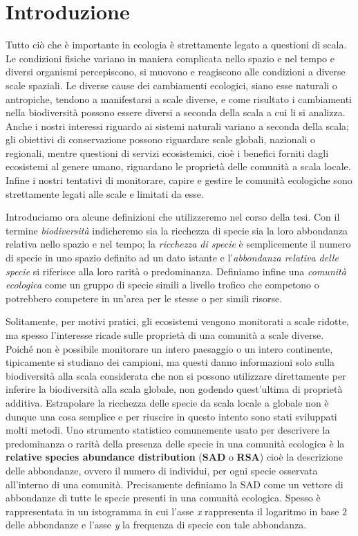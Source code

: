 \chapter*{Introduzione}
Tutto ciò che è importante in ecologia è strettamente legato a questioni di scala\cite{doi:10.1111/2041-210X.12319}. Le condizioni fisiche variano in maniera complicata nello spazio e nel tempo e diversi organismi percepiscono, si muovono e reagiscono alle condizioni a diverse scale spaziali. 
Le diverse cause dei cambiamenti ecologici, siano esse naturali o antropiche, tendono a manifestarsi a scale diverse, e come risultato i cambiamenti nella biodiversità possono essere diversi a seconda della scala a cui li si analizza. Anche i nostri interessi riguardo ai sistemi naturali variano a seconda della scala; gli obiettivi di conservazione possono riguardare scale globali, nazionali o regionali, mentre questioni di servizi ecosistemici, cioè i benefici forniti dagli ecosistemi al genere umano, riguardano le proprietà delle comunità a scala locale. Infine i nostri tentativi di monitorare, capire e gestire le comunità ecologiche sono strettamente legati alle scale e limitati da esse.

Introduciamo ora alcune definizioni che utilizzeremo nel corso della tesi. Con il termine \emph{biodiversità} indicheremo sia la ricchezza di specie sia la loro abbondanza relativa nello spazio e nel tempo; la \emph{ricchezza di specie} è semplicemente il numero di specie in uno spazio definito ad un dato istante e l'\emph{abbondanza relativa delle specie} si riferisce alla loro rarità o predominanza. Definiamo infine una \emph{comunità ecologica} come un gruppo di specie simili a livello trofico che competono o potrebbero competere in un'area per le stesse o per simili risorse. 
 
Solitamente, per motivi pratici, gli ecosistemi vengono monitorati a scale ridotte, ma spesso l'interesse ricade sulle proprietà di una comunità a scale diverse.
Poiché non è possibile monitorare un intero paesaggio o un intero continente, tipicamente si studiano dei campioni, ma questi danno informazioni solo sulla biodiversità alla scala considerata che non si possono utilizzare direttamente per inferire la biodiversità alla scala globale, non godendo quest'ultima di proprietà additiva. Estrapolare la ricchezza delle specie da scala locale a globale non è dunque una cosa semplice e per riuscire in questo intento sono stati sviluppati molti metodi. Uno strumento statistico comunemente usato per descrivere la predominanza o rarità della presenza delle specie in una comunità ecologica è la \textbf{relative species abundance distribution} (\textbf{SAD} o \textbf{RSA}) cioè la descrizione delle abbondanze, ovvero il numero di individui, per ogni specie osservata all'interno di una comunità\cite{doi:McGill2007}. Precisamente definiamo la SAD come un vettore di abbondanze di tutte le specie presenti in una comunità ecologica. Spesso è rappresentata in un istogramma in cui l'asse \emph{x} rappresenta il logaritmo in base $2$ delle abbondanze e l'asse \emph{y} la frequenza di specie con tale abbondanza\cite{Preston}.

